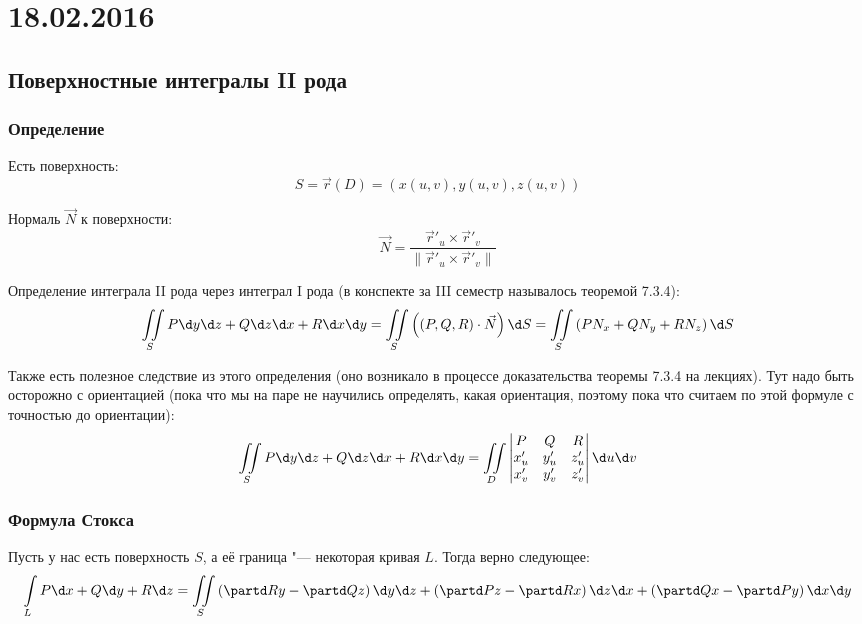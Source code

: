 \chapter{18.02.2016}

\section{Поверхностные интегралы II рода}

\subsection{Определение}
Есть поверхность:
\[ S=\vec r(D)=(x(u, v), y(u, v), z(u, v)) \]
\begin{Def}
	Нормаль $\vec N$ к поверхности:
	\[ \vec N = \frac{\vec r'_u \times \vec r'_v}{\|\vec r'_u \times \vec r'_v\|} \]
\end{Def}

\begin{Def}
	Определение интеграла II рода через интеграл I рода (в конспекте за III семестр
	называлось теоремой 7.3.4):
	\begin{equation}\label{int_surf_II_def}
		\iint\limits_S P \d y \d z + Q\d z \d x + R\d x \d y = \iint\limits_S \left( (P, Q, R) \cdot \vec N \right) \d S = \iint\limits_S \left(P N_x + Q N_y + R N_z\right) \d S
	\end{equation}
\end{Def}
Также есть полезное следствие из этого определения (оно возникало в процессе доказательства теоремы 7.3.4 на лекциях).
Тут надо быть осторожно с ориентацией (пока что мы на паре не научились определять, какая ориентация, поэтому пока
что считаем по этой формуле с точностью до ориентации):
\begin{equation}\label{int_surf_II_coords}
	\iint\limits_S P \d y \d z + Q\d z \d x + R\d x \d y =
	\iint\limits_D
	\begin{vmatrix}
		P & Q & R \\
		x'_u & y'_u & z'_u \\
		x'_v & y'_v & z'_v \\
	\end{vmatrix}
	\d u \d v
\end{equation}

\subsection{Формула Стокса}
Пусть у нас есть поверхность $S$, а её граница "--- некоторая кривая $L$.
Тогда верно следующее:
\begin{equation}
	\int\limits_L P \d x + Q \d y + R \d z =
	\iint\limits_S
	\left(\partd Ry - \partd Qz\right) \d y \d z +
	\left(\partd Pz - \partd Rx\right) \d z \d x +
	\left(\partd Qx - \partd Py\right) \d x \d y
\end{equation}

